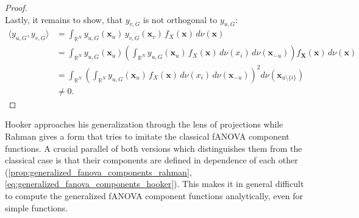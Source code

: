 \begin{proof}
\begin{equation*}
\end{equation*}
Lastly, it remains to show, that $y_{v, G}$ is not orthogonal to $y_{u, G}$:
\begin{align*}
    \langle y_{u, G}, y_{v, G} \rangle
        &= \int_{\mathbb{R}^N} y_{u, G}(\boldsymbol{x}_u) \, y_{v, G}(\boldsymbol{x}_v) \, f_X(\boldsymbol{x}) \, d \nu(\boldsymbol{x}) \\
        &= \int_{\mathbb{R}^N} y_{u, G}(\boldsymbol{x}_u) 
           \left( \int_{\mathbb{R}^N} y_{u, G}(\boldsymbol{x}_u) \, f_X(\boldsymbol{x}) \, d \nu(x_i) \, d \nu(\boldsymbol{x}_{-u}) \right) 
           f_{\boldsymbol{X}}(\boldsymbol{x}) \, d \nu(\boldsymbol{x}) \\
        &= \int_{\mathbb{R}^N} 
           \left( \int_{\mathbb{R}^N} y_{u, G}(\boldsymbol{x}_u) \, f_X(\boldsymbol{x}) \, d \nu(x_i) \, d \nu(\boldsymbol{x}_{-u}) \right)^2 
           d \nu(\boldsymbol{x}_{u \setminus \{i\}}) \\
        &\neq 0.
\end{align*}
\end{proof}
Hooker approaches his generalization through the lens of projections while Rahman gives a form that tries to imitate the classical fANOVA component functions. A crucial parallel of both versions which distinguishes them from the classical case is that their components are defined in dependence of each other (\autoref{prop:generalized_fanova_components_rahman}, \autoref{eq:generalized_fanova_components_hooker}).
This makes it in general difficult to compute the generalized fANOVA component functions analytically, even for simple functions.
